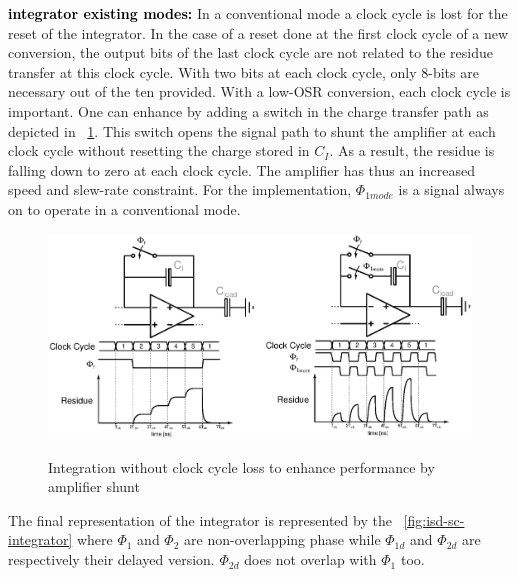 \textbf{\textcolor{black}{integrator existing modes:}}
In a conventional mode a clock cycle is lost for the reset of the integrator. In the case of a reset done at the first clock cycle of a new conversion, the output bits of the last clock cycle are not related to the residue transfer at this clock cycle. With two bits at each clock cycle, only 8-bits are necessary out of the ten provided. With a low-OSR conversion, each clock cycle is important. One can enhance by adding a switch in the charge transfer path as depicted in \figurename~\ref{fig:sigma-delta-modes-integration}. This switch opens the signal path to shunt the amplifier at each clock cycle without resetting the charge stored in $C_I$. As a result, the residue is falling down to zero at each clock cycle. The amplifier has thus an increased speed and slew-rate constraint. For the implementation, \(\Phi_{1mode} \) is a signal always on to operate in a conventional mode.

\begin{figure}[htp]
	\centering
	\includegraphics[width=\textwidth]{Chapter4/Figs/sigma-delta-modes-integration.ps}
	\begin{subfigure}[b]{0.48\textwidth}
		\centering
	\end{subfigure}
	\begin{subfigure}[b]{0.48\textwidth}
		\centering
	\end{subfigure}
	\caption{Integration without clock cycle loss to enhance performance by amplifier shunt}
	\label{fig:sigma-delta-modes-integration}
\end{figure}

The final representation of the integrator is represented by the \figurename~\ref{fig:isd-sc-integrator} where \(\Phi_1 \) and \(\Phi_2 \) are non-overlapping phase while \(\Phi_{1d} \) and \(\Phi_{2d} \) are respectively their delayed version. \(\Phi_{2d} \) does not overlap with \(\Phi_1 \) too.

